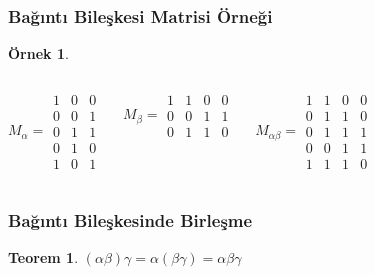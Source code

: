 \documentclass[dvipsnames]{beamer}
\theoremstyle{definition}
\theoremstyle{example}
\newtheorem{ornek}[theorem]{Örnek}
\theoremstyle{plain}
\newtheorem{teorem}[theorem]{Teorem}
\begin{document}
\begin{frame}
  \frametitle{Bağıntı Bileşkesi Matrisi Örneği}

  \begin{ornek}
    \begin{columns}
      \[
        M_\alpha =
          \begin{array}{|ccc|}
            1 & 0 & 0\\
            0 & 0 & 1\\
            0 & 1 & 1\\
            0 & 1 & 0\\
            1 & 0 & 1
          \end{array}
      \]

      \[
        M_\beta =
          \begin{array}{|cccc|}
            1 & 1 & 0 & 0\\
            0 & 0 & 1 & 1\\
            0 & 1 & 1 & 0
          \end{array}
      \]

      \[
        M_{\alpha \beta} =
          \begin{array}{|cccc|}
            1 & 1 & 0 & 0\\
            0 & 1 & 1 & 0\\
            0 & 1 & 1 & 1\\
            0 & 0 & 1 & 1\\
            1 & 1 & 1 & 0
          \end{array}
      \]
    \end{columns}
  \end{ornek}
\end{frame}

\begin{frame}
  \frametitle{Bağıntı Bileşkesinde Birleşme}

  \begin{teorem}
      $(\alpha \beta) \gamma = \alpha (\beta \gamma) = \alpha \beta \gamma$
  \end{teorem}
\end{frame}
\end{document}
